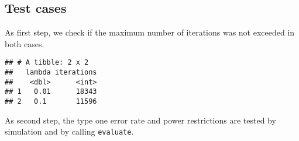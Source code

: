 \documentclass[]{book}
\newenvironment{Shaded}{\begin{snugshade}}{\end{snugshade}}
\newcommand{\DataTypeTok}[1]{\textcolor[rgb]{0.13,0.29,0.53}{#1}}
\newcommand{\KeywordTok}[1]{\textcolor[rgb]{0.13,0.29,0.53}{\textbf{#1}}}
\newcommand{\NormalTok}[1]{#1}
\newcommand{\OperatorTok}[1]{\textcolor[rgb]{0.81,0.36,0.00}{\textbf{#1}}}
\newcommand{\StringTok}[1]{\textcolor[rgb]{0.31,0.60,0.02}{#1}}
\begin{document}
\hypertarget{test-cases-13}{%
\subsection{Test cases}\label{test-cases-13}}

As first step, we check if the maximum number of iterations was not exceeded
in both cases.

\begin{Shaded}
\end{Shaded}

\begin{verbatim}
## # A tibble: 2 x 2
##   lambda iterations
##    <dbl>      <int>
## 1   0.01      18343
## 2   0.1       11596
\end{verbatim}

As second step, the type one error rate and power restrictions are tested
by simulation and by calling \texttt{evaluate}.
\end{document}
